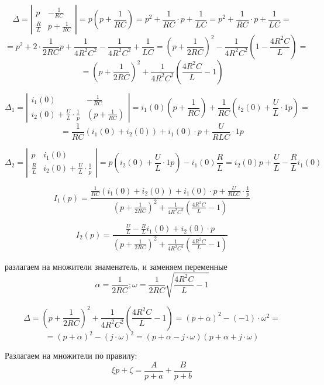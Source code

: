 \documentclass[a4paper,12pt]{article}
\begin{document}
$$
\Delta = \left| 
\begin{array}{cc} p          & -\frac{1}{RC} \\[1.5mm]
	\frac{R}{L} & p + \frac{1}{RC}
\end{array}\right| =
p\left(p + \frac{1}{RC}\right) = p^2 + \frac{1}{RC}\cdot p + \frac{1}{LC}=
p^2 +\frac{1}{RC}\cdot p + \frac{1}{LC} =
$$
$$
=p^2 + 2\cdot\frac{1}{2RC}p + \frac{1}{4R^2C^2} - \frac{1}{4R^2C^2} + \frac{1}{LC} =
\left(p+\frac{1}{2RC}\right)^2 - \frac{1}{4R^2C^2} \left( 1 - \frac{4R^2C}{L}\right) =
$$
$$
=\left(p + \frac{1}{2RC}\right)^2 + \frac{1}{4R^2C^2}\left(\frac{4R^2C}{L}-1\right)
$$

$$
\Delta_1 = \left|
\begin{array}{cc}
	i_1(0) & - \frac{1}{RC} \\[1.5mm]
	i_2(0) +\frac{U}{L}\cdot\frac{1}{p}& \left(p + \frac{1}{RC}\right) 
\end{array}
\right| =
i_1(0)\left(p + \frac{1}{RC}\right) + \frac{1}{RC}\left(i_2(0) + \frac{U}{L}\cdot {1}{p}\right) =
$$
$$
= \frac{1}{RC}(i_1(0) + i_2(0)) + i_1(0)\cdot p + \frac{U}{RLC} \cdot{1}{p} 
$$

$$
\Delta_2 = \left|
\begin{array}{cc} p          & i_1(0) \\[1.5mm]
\frac{R}{L} & i_2(0) + \frac{U}{L}\cdot\frac{1}{p}
\end{array}\right| = p\left(i_2(0)+\frac{U}{L}\cdot{1}{p}\right) - i_1(0)\frac{R}{L} =
i_2(0)p + \frac{U}{L} - \frac{R}{L}i_1(0)
$$


$$
I_1(p) = \frac{\frac{1}{RC}(i_1(0)+i_2(0)) + i_1(0)\cdot p + \frac{U}{RLC}\cdot \frac{1}{p}}
{\left(p + \frac{1}{2RC}\right)^2 + \frac{1}{4R^2C^2}\left(\frac{4R^2C}{L} - 1\right)}
$$

$$
I_2(p) = \frac{\frac{U}{L}- \frac{R}{L}i_1(0) + i_2(0)\cdot p}
{\left(p + \frac{1}{2RC}\right)^2 + \frac{1}{4R^2C^2}\left(\frac{4R^2C}{L} - 1\right)}
$$

разлагаем на множители знаменатель, и заменяем переменные
$$
\alpha = \frac{1}{2RC}; \omega = \frac{1}{2RC}\sqrt{\frac{4R^2C}{L}-1}
$$

$$
\Delta = \left(p + \frac{1}{2RC}\right)^2 + \frac{1}{4R^2C^2}\left(\frac{4R^2C}{L} - 1\right) =
(p+\alpha)^2 - (-1)\cdot\omega^2 =
$$
$$
=(p+\alpha)^2 - (j\cdot\omega)^2 = (p + \alpha - j\cdot\omega)(p+\alpha+j\cdot\omega)
$$

Разлагаем на множители по правилу:
$$
\xi p + \zeta = \frac{A}{p+a} + \frac{B}{p+b}
$$
\end{document}
